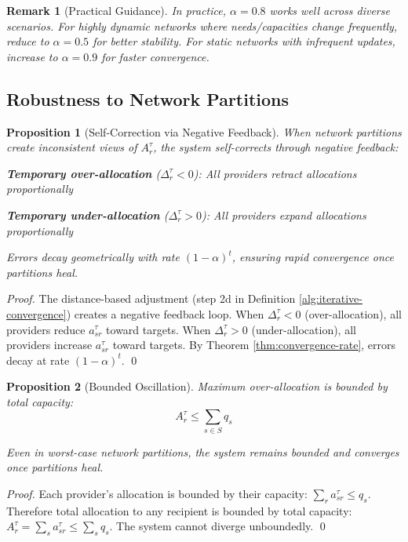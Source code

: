 \documentclass[11pt]{article}
\newtheorem{proposition}{Proposition}
\newtheorem{remark}{Remark}
\begin{document}
\begin{remark}[Practical Guidance]
In practice, $\alpha = 0.8$ works well across diverse scenarios. For highly dynamic networks where needs/capacities change frequently, reduce to $\alpha = 0.5$ for better stability. For static networks with infrequent updates, increase to $\alpha = 0.9$ for faster convergence.
\end{remark}

\subsection{Robustness to Network Partitions}

\begin{proposition}[Self-Correction via Negative Feedback]
When network partitions create inconsistent views of $A_r^\tau$, the system self-corrects through negative feedback:

\textbf{Temporary over-allocation} ($\Delta_r^\tau < 0$): All providers retract allocations proportionally

\textbf{Temporary under-allocation} ($\Delta_r^\tau > 0$): All providers expand allocations proportionally

Errors decay geometrically with rate $(1-\alpha)^t$, ensuring rapid convergence once partitions heal.
\end{proposition}

\begin{proof}
The distance-based adjustment (step 2d in Definition \ref{alg:iterative-convergence}) creates a negative feedback loop. When $\Delta_r^\tau < 0$ (over-allocation), all providers reduce $a_{sr}^\tau$ toward targets. When $\Delta_r^\tau > 0$ (under-allocation), all providers increase $a_{sr}^\tau$ toward targets. By Theorem \ref{thm:convergence-rate}, errors decay at rate $(1-\alpha)^t$. \qed
\end{proof}

\begin{proposition}[Bounded Oscillation]
Maximum over-allocation is bounded by total capacity:
\[
A_r^\tau \leq \sum_{s \in S} q_s
\]

Even in worst-case network partitions, the system remains bounded and converges once partitions heal.
\end{proposition}

\begin{proof}
Each provider's allocation is bounded by their capacity: $\sum_r a_{sr}^\tau \leq q_s$. Therefore total allocation to any recipient is bounded by total capacity: $A_r^\tau = \sum_s a_{sr}^\tau \leq \sum_s q_s$. The system cannot diverge unboundedly. \qed
\end{proof}
\end{document}
